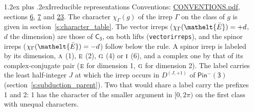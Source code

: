 \documentclass[10pt,a4paper]{article}
\makeatletter
\renewcommand\section{\@startsection{section}{1}{\z@}{-3ex plus -1ex minus -.2ex}%
  {1.2ex plus .2ex}{\normalfont\large\sffamily\bfseries\color{parttitle}}}
\numberwithin{equation}{section}
\newcommand{\eltfont}[1]{{\let\sigma\eltsigma\mathelt{#1}}}
\newcommand{\grp}[1]{\mathsf{#1}}
\newcommand{\irr}[1]{\text{\normalfont\scshape #1}}
\newcommand{\elt}[1]{\eltfont{#1}}
\newcommand{\irrJp}[2]{D^{(#1,#2)}}
\newcommand{\irchar}[1]{\chi_{#1}}
\newcommand{\barred}[1]{\bar{#1}}
\makeatother
\begin{document}
\section{Irreducible representations}\label{s:irreps}
Conventions: \href{../../CONVENTIONS.pdf}{CONVENTIONS.pdf}, sections \href{../../../rotation/CONVENTIONS.pdf\#conv.6}{6}, \href{../../../rotation/CONVENTIONS.pdf\#conv.7}{7} and \href{../../CONVENTIONS.pdf\#conv.23}{23}.
\leavevmode\label{n:function.character}\label{n:irrep.Gamma}The character $\irchar{\Gamma}(g)$ of the irrep $\Gamma$ on the class of $g$ is given in section~\ref{s:character_table}. \label{n:index.dimension}The vector irreps ($\irchar{\Gamma}(\elt{\barred{E}}) = +d$, $d$ the dimension) are those of \href{../../../rotation/data/pdf/C3.pdf}{$\grp{C_{3}}$}, on both lifts (\texttt{vectorirreps}), and the spinor irreps ($\irchar{\Gamma}(\elt{\barred{E}}) = -d$) follow below the rule. A spinor irrep is labeled by its dimension, $\irr{a}$ (1), $\irr{e}$ (2), $\irr{g}$ (4) or $\irr{i}$ (6), and a complex one by that of its complex-conjugate pair ($\irr{e}$ for dimension 1, $\irr{g}$ for dimension 2). The label carries the least half-integer $J$ at which the irrep occurs in $\irrJp{J}{+1}$ of $\grp{Pin^{-}(3)}$ (section~\ref{s:subduction_parent}). Two that would share a label carry the prefixes 1 and 2: 1 has the character of the smaller argument in $[0, 2\pi)$ on the first class with unequal characters.
\end{document}
